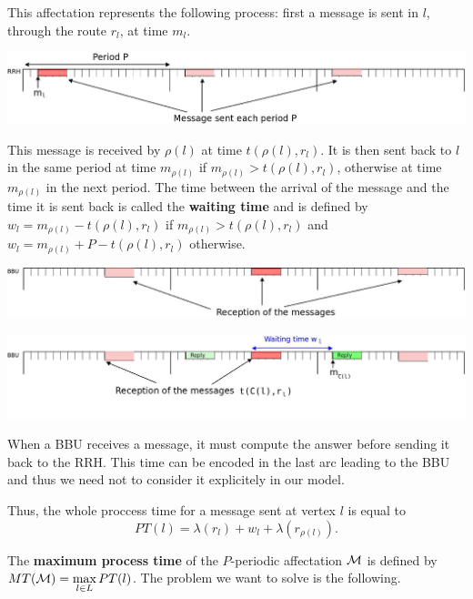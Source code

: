 \documentclass[a4paper,10pt]{article}
\begin{document}
      This affectation represents the following process: first a message is sent in $l$, through the route $r_l$, at time $m_l$.
      
      \begin{center}
      \includegraphics[scale=0.2]{rrh.jpeg}
      \end{center}
      
      This message is received by $\rho(l)$ at time $t(\rho(l),r_l)$. It is then sent back to $l$ in the same period at time $m_{\rho(l)}$ if $m_{\rho(l)} > t(\rho(l),r_l)$, otherwise at time $m_{\rho(l)}$ in the next period. The time between the arrival of the message and the time it is sent back is called the \textbf{waiting time} and is defined by $w_l = m_{\rho(l)} - t(\rho(l),r_l)$ if $m_{\rho(l)} > t(\rho(l),r_l)$ and $w_l = m_{\rho(l)} + P - t(\rho(l),r_l)$ otherwise.
      
       \begin{center}
      \includegraphics[scale=0.2]{BBU1.jpeg}
      
      \includegraphics[scale=0.2]{BBU2.jpeg}
      \end{center}
     
      
      When a BBU receives a message, it must compute the answer before sending it back to the RRH. This time can be encoded
      in the last arc leading to the BBU and thus we need not to consider it explicitely in our model.
    
      Thus, the whole proccess time for a message sent at vertex $l$ is equal to
      $$
      PT(l)=\lambda(r_l)+ w_l+\lambda(r_{\rho(l)}).
      $$
      
    The {\bf maximum process time} of the $P$-periodic affectation ${\cal M} $ is defined by $MT({\cal M})=\max\limits_{l \in L} PT(l)$. The problem we want to solve is the following. 
\end{document}
